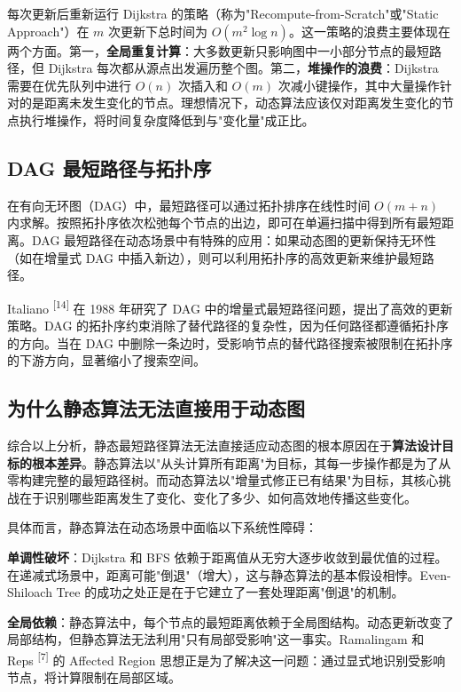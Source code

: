 \documentclass[12pt,a4paper]{ctexart}
\begin{document}
每次更新后重新运行 Dijkstra 的策略（称为"Recompute-from-Scratch"或"Static Approach"）在 $m$ 次更新下总时间为 $O(m^2\log n)$。这一策略的浪费主要体现在两个方面。第一，\textbf{全局重复计算}：大多数更新只影响图中一小部分节点的最短路径，但 Dijkstra 每次都从源点出发遍历整个图。第二，\textbf{堆操作的浪费}：Dijkstra 需要在优先队列中进行 $O(n)$ 次插入和 $O(m)$ 次减小键操作，其中大量操作针对的是距离未发生变化的节点。理想情况下，动态算法应该仅对距离发生变化的节点执行堆操作，将时间复杂度降低到与"变化量"成正比。

\subsection{DAG 最短路径与拓扑序}

在有向无环图（DAG）中，最短路径可以通过拓扑排序在线性时间 $O(m+n)$ 内求解。按照拓扑序依次松弛每个节点的出边，即可在单遍扫描中得到所有最短距离。DAG 最短路径在动态场景中有特殊的应用：如果动态图的更新保持无环性（如在增量式 DAG 中插入新边），则可以利用拓扑序的高效更新来维护最短路径。

Italiano \textsuperscript{[14]}  在 1988 年研究了 DAG 中的增量式最短路径问题，提出了高效的更新策略。DAG 的拓扑序约束消除了替代路径的复杂性，因为任何路径都遵循拓扑序的方向。当在 DAG 中删除一条边时，受影响节点的替代路径搜索被限制在拓扑序的下游方向，显著缩小了搜索空间。

\subsection{为什么静态算法无法直接用于动态图}

综合以上分析，静态最短路径算法无法直接适应动态图的根本原因在于\textbf{算法设计目标的根本差异}。静态算法以"从头计算所有距离"为目标，其每一步操作都是为了从零构建完整的最短路径树。而动态算法以"增量式修正已有结果"为目标，其核心挑战在于识别哪些距离发生了变化、变化了多少、如何高效地传播这些变化。

具体而言，静态算法在动态场景中面临以下系统性障碍：

\textbf{单调性破坏}：Dijkstra 和 BFS 依赖于距离值从无穷大逐步收敛到最优值的过程。在递减式场景中，距离可能"倒退"（增大），这与静态算法的基本假设相悖。Even-Shiloach Tree 的成功之处正是在于它建立了一套处理距离"倒退"的机制。

\textbf{全局依赖}：静态算法中，每个节点的最短距离依赖于全局图结构。动态更新改变了局部结构，但静态算法无法利用"只有局部受影响"这一事实。Ramalingam 和 Reps \textsuperscript{[7]}  的 Affected Region 思想正是为了解决这一问题：通过显式地识别受影响节点，将计算限制在局部区域。
\end{document}
